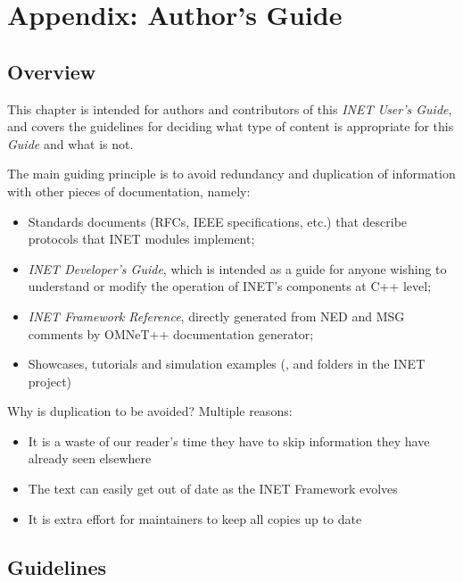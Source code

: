 \chapter{Appendix: Author's Guide}
\label{cha:authors-guide}


\section{Overview}

This chapter is intended for authors and contributors of this 
\textit{INET User's Guide}, and covers the guidelines for deciding
what type of content is appropriate for this \textit{Guide} and 
what is not.

The main guiding principle is to avoid redundancy and duplication
of information with other pieces of documentation, namely:

\begin{itemize}
  \item Standards documents (RFCs, IEEE specifications, etc.) that
    describe protocols that INET modules implement;
  \item \textit{INET Developer's Guide}, which is intended as a guide
    for anyone wishing to understand or modify the operation of
    INET's components at C++ level; 
  \item \textit{INET Framework Reference}, directly generated from 
    NED and MSG comments by OMNeT++ documentation generator;
  \item Showcases, tutorials and simulation examples (,
     and  folders in the INET project)
\end{itemize}

Why is duplication to be avoided? Multiple reasons:

\begin{itemize}
  \item It is a waste of our reader's time they have to skip information
     they have already seen elsewhere
  \item The text can easily get out of date as the INET Framework evolves
  \item It is extra effort for maintainers to keep all copies up to date  
\end{itemize}


\section{Guidelines}

